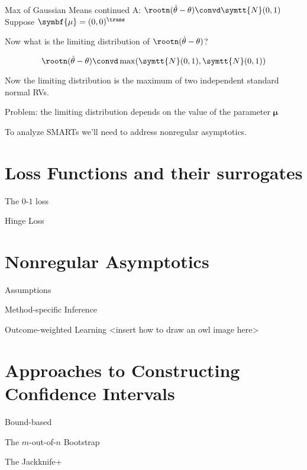 \documentclass[aspectratio=169, professionalfonts]{beamer}
\begin{document}
\begin{frame}{Max of Gaussian Means continued}
	A: $\rootn (\hat{\theta} - \theta) \convd \symtt{N}(0, 1)$
	\pause
	\vfill
	Suppose $\symbf{\mu} = (0 , 0)^{\trans}$

	Now what is the limiting distribution of $ \rootn (\hat{\theta} - \theta)$?

	\vfill \pause

	$$\rootn (\hat{\theta} - \theta) \convd \max(\symtt{N}(0, 1), \symtt{N}(0, 1))$$

	Now the limiting distribution is the maximum of two independent standard
	normal RVs.

	\vfill \pause

	Problem: the limiting distribution depends on the value of the parameter
	$\symbf{\mu}$

	\vfill

	To analyze SMARTs we'll need to address nonregular asymptotics.
\end{frame}

\section{Loss Functions and their surrogates}
\begin{frame}{The $0$-$1$ loss}
\end{frame}

\begin{frame}{Hinge Loss}
\end{frame}

\begin{frame}{}
\end{frame}

\begin{frame}{}
\end{frame}


\section{Nonregular Asymptotics}

\begin{frame}{Assumptions}
\end{frame}

\begin{frame}{Method-specific Inference}
\end{frame}

\begin{frame}{Outcome-weighted Learning}
	<insert how to draw an owl image here>
\end{frame}


\section{Approaches to Constructing Confidence Intervals}

\begin{frame}{Bound-based}
\end{frame}

\begin{frame}{The $m$-out-of-$n$ Bootstrap}
\end{frame}

\begin{frame}{The Jackknife+}
\end{frame}
\end{document}

